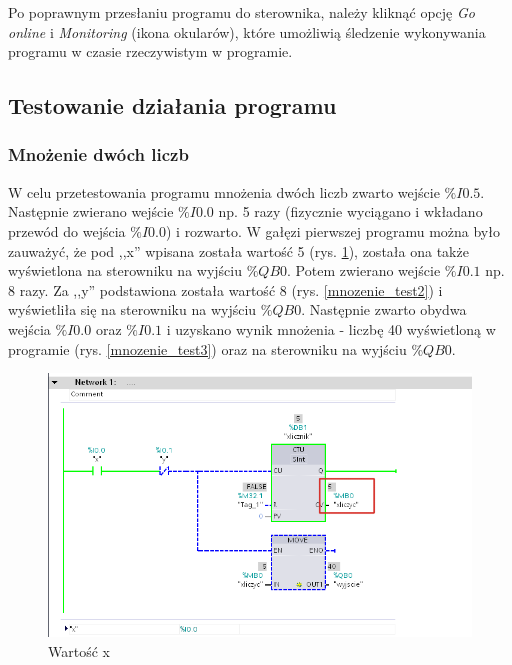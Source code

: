 \documentclass[12pt]{article}
\begin{document}
Po poprawnym przesłaniu programu do sterownika, należy kliknąć opcję \textit{Go online} i \textit{Monitoring} (ikona okularów), które umożliwią śledzenie wykonywania programu w czasie rzeczywistym w programie.

\subsection{Testowanie działania programu}
\subsubsection{Mnożenie dwóch liczb}

W celu przetestowania programu mnożenia dwóch liczb zwarto wejście $\%I0.5$. Następnie zwierano wejście $\%I0.0$ np. 5 razy (fizycznie wyciągano i wkładano przewód do wejścia $\%I0.0$) i rozwarto. W gałęzi pierwszej programu można było zauważyć, że pod ,,x'' wpisana została wartość 5 (rys. \ref{mnozenie_test1}), została ona także wyświetlona na sterowniku na wyjściu $\%QB0$. Potem zwierano wejście $\%I0.1$ np. 8 razy. Za ,,y'' podstawiona została wartość 8 (rys. \ref{mnozenie_test2}) i wyświetliła się na sterowniku na wyjściu $\%QB0$. Następnie zwarto obydwa wejścia $\%I0.0$ oraz $\%I0.1$ i uzyskano wynik mnożenia - liczbę 40 wyświetloną w programie (rys. \ref{mnozenie_test3}) oraz na sterowniku na wyjściu $\%QB0$.

\begin{figure}[H]
    \centering
    \includegraphics[width=\textwidth]{./zdj/mnozenie_test1.png}
    \caption{Wartość x}
    \label{mnozenie_test1}
\end{figure} 
\end{document}

